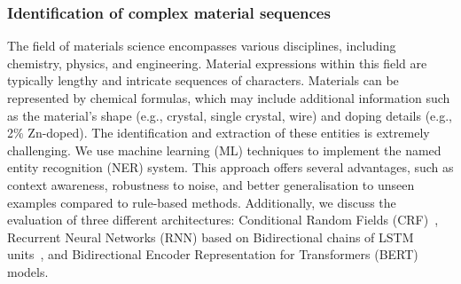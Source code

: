 \subsubsection{Identification of complex material sequences}
\label{sec:intro-ner-materials}
The field of materials science encompasses various disciplines, including chemistry, physics, and engineering. 
Material expressions within this field are typically lengthy and intricate sequences of characters. Materials can be represented by chemical formulas, which may include additional information such as the material's shape (e.g., crystal, single crystal, wire) and doping details (e.g., 2\% Zn-doped). 
The identification and extraction of these entities is extremely challenging. 
We use machine learning (ML) techniques to implement the named entity recognition (NER) system. This approach offers several advantages, such as context awareness, robustness to noise, and better generalisation to unseen examples compared to rule-based methods. Additionally, we discuss the evaluation of three different architectures: Conditional Random Fields (CRF)~\cite{lafferty2001conditional}, Recurrent Neural Networks (RNN) based on Bidirectional chains of LSTM units~\cite{lample2016neural}, and Bidirectional Encoder Representation for Transformers (BERT)~\cite{devlin2018bert} models.

